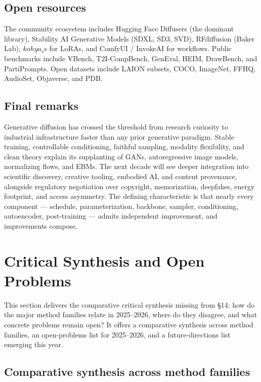 \subsection{Open resources}\label{open-resources}

The community ecosystem includes Hugging Face Diffusers (the dominant library), Stability AI Generative Models (SDXL, SD3, SVD), RFdiffusion (Baker Lab), \(kohya_s\)s for LoRAs, and ComfyUI / InvokeAI for workflows. Public benchmarks include VBench, T2I-CompBench, GenEval, HEIM, DrawBench, and PartiPrompts. Open datasets include LAION subsets, COCO, ImageNet, FFHQ, AudioSet, Objaverse, and PDB.

\subsection{Final remarks}\label{final-remarks}

Generative diffusion has crossed the threshold from research curiosity to industrial infrastructure faster than any prior generative paradigm. Stable training, controllable conditioning, faithful sampling, modality flexibility, and clean theory explain its supplanting of GANs, autoregressive image models, normalizing flows, and EBMs. The next decade will see deeper integration into scientific discovery, creative tooling, embodied AI, and content provenance, alongside regulatory negotiation over copyright, memorization, deepfakes, energy footprint, and access asymmetry. The defining characteristic is that nearly every component --- schedule, parameterization, backbone, sampler, conditioning, autoencoder, post-training --- admits independent improvement, and improvements compose.

\section{Critical Synthesis and Open Problems}\label{critical-synthesis-and-open-problems}

This section delivers the comparative critical synthesis missing from §14: how do the major method families relate in 2025--2026, where do they disagree, and what concrete problems remain open? It offers a comparative synthesis across method families, an open-problems list for 2025--2026, and a future-directions list emerging this year.

\subsection{Comparative synthesis across method families}\label{comparative-synthesis-across-method-families}

